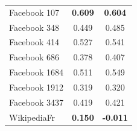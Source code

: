 \begin{table}[t]
\begin{center}
\begin{tabular}{l|c|c}
Facebook 107 & \textbf{0.609} & \textbf{0.604}\\
Facebook 348 & 0.449 & 0.485\\
Facebook 414 & 0.527 & 0.541\\
Facebook 686 & 0.378 & 0.407\\
Facebook 1684 & 0.511 & 0.549\\
Facebook 1912 & 0.319 & 0.320\\
Facebook 3437 & 0.419 & 0.421\\
WikipediaFr  & \textbf{0.150} & \textbf{-0.011}\\
\hline
\end{tabular}
\end{center}
\label{tab:CISIP_SVD_scores}
\end{table}
